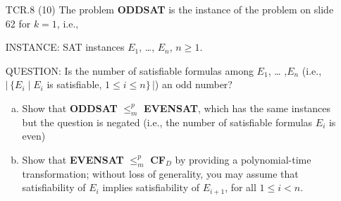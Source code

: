 \documentclass[11pt,a4paper]{article}
\begin{document}
\begin{enumerate}
%
%
%

\newpage


\item[TCR.8] (10) The problem {\bf ODDSAT} is the instance of the problem on
  slide 62 for $k=1$, i.e.,

\smallskip

INSTANCE: SAT instances  $E_1$, \ldots, $E_n$,  $n\geq 1$.

\smallskip

QUESTION: Is the number of satisfiable formulas among $E_1$, \ldots
,$E_n$  (i.e., $|\,\{ E_i \mid  E_i$ is satisfiable, $1\leq i \leq n\}\,|$)
an odd number?  

\begin{enumerate}[(a)]
\item Show that  {\bf ODDSAT} $\leq^p_m$ {\bf EVENSAT}, which has
the same instances but the question is negated (i.e., the number of
satisfiable formulas $E_i$ is even)

\item Show that {\bf EVENSAT} $\leq^p_m$ {\bf CF}$_D$ by providing a
polynomial-time transformation; without
loss of generality, you may assume that satisfiability of $E_i$ implies satisfiability of $E_{i+1}$, for 
all $1\leq i < n$.
\end{enumerate}


\end{enumerate}
\end{document}
